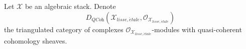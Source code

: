 \begin{lemma}
\label{lemma-match-with-martin}
Let $\mathcal{X}$ be an algebraic stack. Denote
$$
D_{\textit{QCoh}}(\mathcal{X}_{lisse,\acute{e}tale},
\mathcal{O}_{\mathcal{X}_{lisse,\acute{e}tale}})
$$
the triangulated category of complexes
$\mathcal{O}_{\mathcal{X}_{lisse,\acute{e}tale}}$-modules with
quasi-coherent cohomology sheaves.

\end{lemma}













